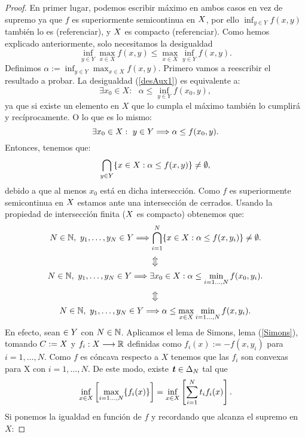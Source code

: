 \begin{proof}
En primer lugar, podemos escribir máximo en ambos casos en vez de supremo ya que $ f $ es superiormente semicontinua en $ X $, por ello $ \inf_{y \in Y} f(x,y) $ también lo es (referenciar), y $ X $ es compacto (referenciar). Como hemos explicado anteriormente, solo necesitamos la desigualdad 
\begin{equation}\label{desAux1}
\inf_{y \in Y} \max_{x \in X} f(x,y) \leq \max_{x \in X} \inf_{y \in Y} f(x,y).
\end{equation}  Definimos $ \alpha := \inf_{y \in Y} \max_{x \in X} f(x,y) $. Primero vamos a reescribir el resultado a probar. La desigualdad (\ref{desAux1}) es equivalente a:\\
\[
\exists x_0 \in X:\text{ }\alpha \leq \inf_{y \in Y} f(x_0,y),
\]
ya que si existe un elemento en $ X $ que lo cumpla el máximo también lo cumplirá y recíprocamente. O lo que es lo mismo:
\[
\exists x_0 \in X:\text{ }y \in Y \Longrightarrow \alpha \leq f(x_0,y).
\]
Entonces, tenemos que:
\[
\bigcap_{y\in Y}\{x \in X: \alpha \leq f(x, y) \} \neq \emptyset,
\]
debido a que al menos $ x_0 $ está en dicha intersección. Como $ f $ es superiormente semicontinua en $ X $ estamos ante una intersección de cerrados. Usando la propiedad de intersección finita ($ X $ es compacto) obtenemos que:
\[
N\in\mathbb{N}, \text{ }y_1,\dots,y_N \in Y \Longrightarrow \bigcap_{i=1}^{N}\{x \in X: \alpha \leq f(x, y_i) \} \neq \emptyset.
\]
\[
\big\Updownarrow
\]
\[
N\in\mathbb{N}, \text{ }y_1,\dots,y_N \in Y \Longrightarrow \exists x_0\in X:\alpha \leq \min_{i=1\dots,N }f(x_0,y_i).
\]
\[
\big\Updownarrow
\]
\begin{equation}\label{desAux}
N\in\mathbb{N}, \text{ }y_1,\dots,y_N \in Y \Longrightarrow \alpha \leq \max_{x \in X} \min_{i=1\dots,N }f(x,y_i).
\end{equation}
En efecto, sean $ \in Y$ con $ N \in \mathbb{N} $. Aplicamos el lema de Simons, lema (\ref{Simons}), tomando $ C := X $ y $ f_i: X \longrightarrow \mathbb{R} $ definidas como $ f_i(x):=-f(x,y_i) $ para $ i=1,\dots,N $. Como $ f $ es cóncava respecto a $ X $ tenemos que las $ f_i $ son convexas para X con $  i=1,\dots,N $. De este modo, existe $ \textbf{\emph{t}} \in \Delta_N$ tal que
\[
\inf_{x \in X}\left[ \max_{i=1\dots,N } \{f_i(x)\}\right] = \inf_{x \in X} \left[ \sum_{i=1}^{N} t_i f_i(x) \right].
\] 
Si ponemos la igualdad en función de $ f $ y recordando que alcanza el supremo en $ X $:

\end{proof}
